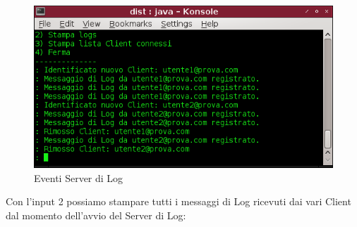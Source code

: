 \documentclass[a4paper, 11pt]{article} %
\begin{document}
\begin{center}
\begin{figure}[H]
\includegraphics[width=1.0\textwidth]{images/server_di_log-4.png}
\vspace{-0.6cm}
\caption{Eventi Server di Log}
\end{figure}
\end{center}
Con l'input 2 possiamo stampare tutti i messaggi di Log ricevuti dai vari Client dal momento dell'avvio del Server di Log:\\
\vspace{-0.8cm}
\end{document}
